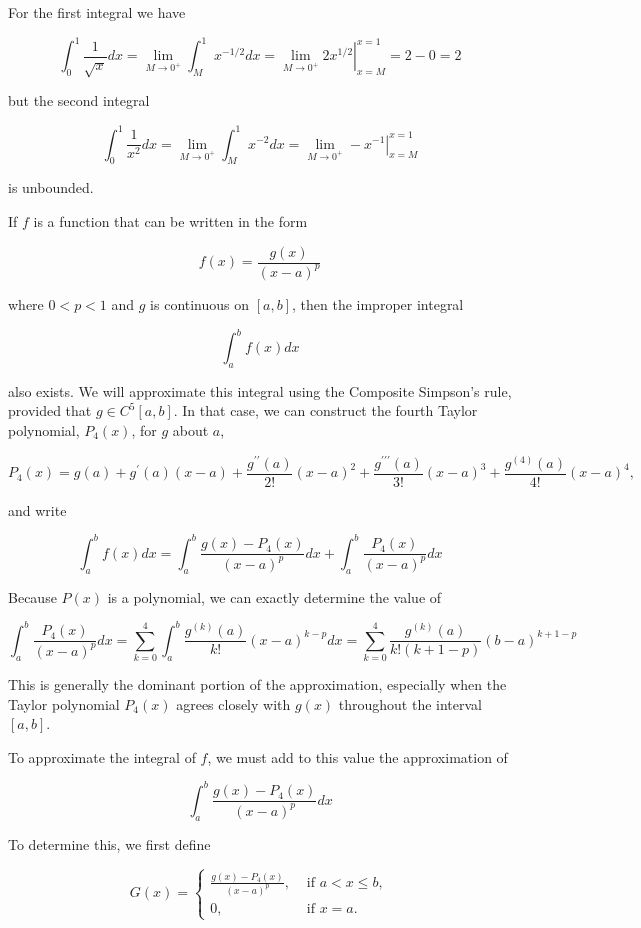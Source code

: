 \begin{mysolution}
For the first integral we have

$$
\int_{0}^{1} \frac{1}{\sqrt{x}} d x=\lim _{M \rightarrow 0^{+}} \int_{M}^{1} x^{-1 / 2} d x=\left.\lim _{M \rightarrow 0^{+}} 2 x^{1 / 2}\right|_{x=M} ^{x=1}=2-0=2
$$

but the second integral

$$
\int_{0}^{1} \frac{1}{x^{2}} d x=\lim _{M \rightarrow 0^{+}} \int_{M}^{1} x^{-2} d x=\lim _{M \rightarrow 0^{+}}-\left.x^{-1}\right|_{x=M} ^{x=1}
$$

is unbounded.

If $f$ is a function that can be written in the form

$$
f(x)=\frac{g(x)}{(x-a)^{p}}
$$

where $0<p<1$ and $g$ is continuous on $[a, b]$, then the improper integral

$$
\int_{a}^{b} f(x) d x
$$

also exists. We will approximate this integral using the Composite Simpson's rule, provided that $g \in C^{5}[a, b]$. In that case, we can construct the fourth Taylor polynomial, $P_{4}(x)$, for $g$ about $a$,

$$
P_{4}(x)=g(a)+g^{\prime}(a)(x-a)+\frac{g^{\prime \prime}(a)}{2!}(x-a)^{2}+\frac{g^{\prime \prime \prime}(a)}{3!}(x-a)^{3}+\frac{g^{(4)}(a)}{4!}(x-a)^{4},
$$

and write


\begin{equation}\label{eqn:impropinteeaxm1eqn1}
\int_{a}^{b} f(x) d x=\int_{a}^{b} \frac{g(x)-P_{4}(x)}{(x-a)^{p}} d x+\int_{a}^{b} \frac{P_{4}(x)}{(x-a)^{p}} d x 
\end{equation}


Because $P(x)$ is a polynomial, we can exactly determine the value of


\begin{equation}\label{eqn:impropinteeaxm1eqn2}
\int_{a}^{b} \frac{P_{4}(x)}{(x-a)^{p}} d x=\sum_{k=0}^{4} \int_{a}^{b} \frac{g^{(k)}(a)}{k!}(x-a)^{k-p} d x=\sum_{k=0}^{4} \frac{g^{(k)}(a)}{k!(k+1-p)}(b-a)^{k+1-p}
\end{equation}


This is generally the dominant portion of the approximation, especially when the Taylor polynomial $P_{4}(x)$ agrees closely with $g(x)$ throughout the interval $[a, b]$.

To approximate the integral of $f$, we must add to this value the approximation of

$$
\int_{a}^{b} \frac{g(x)-P_{4}(x)}{(x-a)^{p}} d x
$$

To determine this, we first define

$$
G(x)= \begin{cases}\frac{g(x)-P_{4}(x)}{(x-a)^{p}}, & \text { if } a<x \leq b, \\ 0, & \text { if } x=a .\end{cases}
$$
\end{mysolution}
